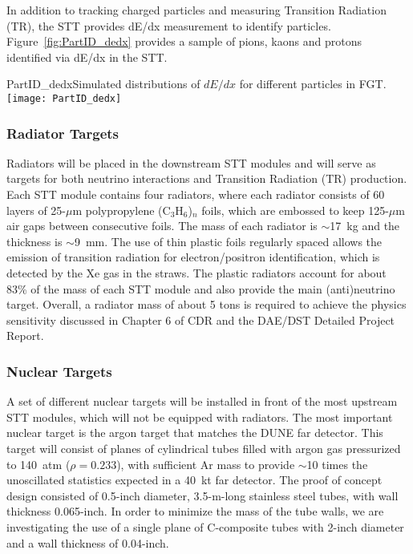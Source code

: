 In addition to tracking charged particles and measuring Transition Radiation (TR), 
the STT provides dE/dx measurement to identify particles. 
Figure~\ref{fig:PartID_dedx} provides a sample of pions, kaons and protons identified via dE/dx in the STT.
\begin{cdrfigure}
{PartID_dedx}{Simulated distributions of $dE/dx$ for different particles in FGT.}
\texttt{[image: PartID\_dedx]}
\end{cdrfigure}

\subsubsection{Radiator Targets} 


Radiators will be placed in the downstream STT modules and will serve
as targets for both neutrino interactions and Transition Radiation
(TR) production. Each STT module contains four radiators, where each
radiator consists of 60 layers of 25-$\mu$m polypropylene
(C$_3$H$_6$)$_n$ foils, which are embossed to keep 125-$\mu$m air gaps
between consecutive foils.  The mass of each radiator is $\sim$17~kg
and the thickness is $\sim$9~mm. The use of thin plastic foils
regularly spaced allows the emission of transition radiation for
electron/positron identification, which is detected by the Xe gas in
the straws. The plastic radiators account for about 83\% of the mass of each STT module and 
also provide the main (anti)neutrino target. Overall, a radiator mass of about 5 tons 
is required to achieve the physics sensitivity discussed in 
Chapter 6 of CDR \volphys{}  %
and the DAE/DST Detailed Project Report\cite{DPR}. 

\subsubsection{Nuclear Targets} 

A set of different nuclear targets will be installed in front of the
most upstream STT modules, which will not be equipped with radiators.
The most important nuclear target is the argon target that matches
the DUNE far detector.  
This target will consist of planes of cylindrical tubes filled with 
argon gas pressurized to 140~atm ($\rho = 0.233$), with
sufficient Ar mass to provide $\sim$10 times the unoscillated
statistics expected in a 40~kt far detector. The proof of concept design 
consisted of 0.5-inch diameter, 3.5-m-long stainless steel tubes, 
with wall thickness 0.065-inch. In order to minimize the mass of the 
tube walls, we are investigating the use of a single plane of C-composite 
tubes with 2-inch diameter and a wall thickness of 0.04-inch.  


